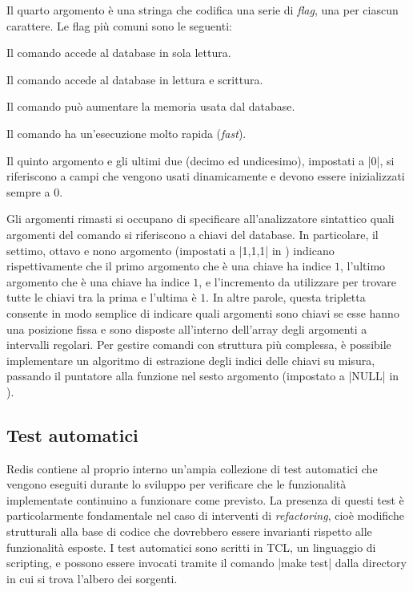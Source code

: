 Il quarto argomento è una stringa che codifica una serie di \emph{flag}, una per ciascun carattere.
Le flag più comuni sono le seguenti:

\begin{description}[labelindent=2\parindent,leftmargin=!,labelwidth=2em,font={\bfseries\ttfamily}]
  \item[r] Il comando accede al database in sola lettura.
  \item[w] Il comando accede al database in lettura e scrittura.
  \item[m] Il comando può aumentare la memoria usata dal database.
  \item[F] Il comando ha un'esecuzione molto rapida (\emph{fast}).
\end{description}

Il quinto argomento e gli ultimi due (decimo ed undicesimo), impostati a \cverb|0|, si riferiscono 
a campi che vengono usati dinamicamente e devono essere inizializzati sempre a $0$.

Gli argomenti rimasti si occupano di specificare all'analizzatore sintattico quali argomenti del
comando si riferiscono a chiavi del database. In particolare, il settimo, ottavo e nono argomento
(impostati a \cverb|1,1,1| in ) indicano rispettivamente che il primo argomento che è
una chiave ha indice $1$, l'ultimo argomento che è una chiave ha indice $1$, e l'incremento da
utilizzare per trovare tutte le chiavi tra la prima e l'ultima è $1$. In altre parole, questa
tripletta consente in modo semplice di indicare quali argomenti sono chiavi se esse hanno una
posizione fissa e sono disposte all'interno dell'array degli argomenti a intervalli regolari. Per
gestire comandi con struttura più complessa, è possibile implementare un algoritmo di estrazione
degli indici delle chiavi su misura, passando il puntatore alla funzione nel sesto argomento
(impostato a \cverb|NULL| in ).

\subsection{Test automatici}

Redis contiene al proprio interno un'ampia collezione di test automatici che vengono eseguiti
durante lo sviluppo per verificare che le funzionalità implementate continuino a funzionare come
previsto. La presenza di questi test è particolarmente fondamentale nel caso di interventi di
\emph{refactoring}, cioè modifiche strutturali alla base di codice che dovrebbero essere invarianti
rispetto alle funzionalità esposte. I test automatici sono scritti in TCL, un linguaggio di
scripting, e possono essere invocati tramite il comando \cverb|make test| dalla directory in cui
si trova l'albero dei sorgenti.

